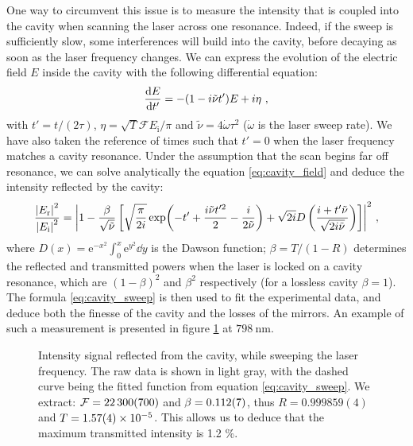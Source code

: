 \documentclass[11pt]{article}
\newcommand{\e}[1]{\text{e}^{#1}}
\numberwithin{equation}{section}
\numberwithin{figure}{section}
\begin{document}
One way to circumvent this issue is to measure the intensity that is coupled into the cavity when scanning the laser across one resonance. Indeed, if the sweep is sufficiently slow, some interferences will build into the cavity, before decaying as soon as the laser frequency changes. We can express the evolution of the electric field $E$ inside the cavity with the following differential equation:
%
\begin{equation}
	\label{eq:cavity_field}
	\dv{E}{t'} = - (1 - i \tilde{\nu} t') E + i \eta~,
\end{equation}
%
with $t' = t / (2 \tau)$, $\eta = \sqrt{T} \mathcal{F} E_\mathrm{i} / \pi$ and $\tilde{\nu} = 4 \dot{\omega} \tau^2$ ($ \dot{\omega}$ is the laser sweep rate). We have also taken the reference of times such that $t'=0$ when the laser frequency matches a cavity resonance. Under the assumption that the scan begins far off resonance, we can solve analytically the equation \eqref{eq:cavity_field} and deduce the intensity reflected by the cavity:
%
\begin{equation}
	\label{eq:cavity_sweep}
	\frac{\abs{E_\text{r}}^2 }{\abs{E_\text{i}}^2 }= \abs{1-\frac{\beta}{\sqrt{\tilde{\nu}}} \left[ \sqrt{\frac{\pi}{2i}} \exp(-t' +\frac{i \tilde{\nu} t'^2}{2} - \frac{i}{2 \tilde{\nu}}) + \sqrt{2i} D\left( \frac{i+t' \tilde{\nu}}{\sqrt{2i \tilde{\nu}}} \right) \right] }^2~,
\end{equation}
%
where $D(x) = \e{-x^2} \int_0^x \e{y^2} \dd{y}$ is the Dawson function; $\beta = T / (1 - R)$ determines the reflected and transmitted powers when the laser is locked on a cavity resonance, which are $(1 - \beta)^2$ and $\beta^2$ respectively (for a lossless cavity $\beta = 1$). The formula \eqref{eq:cavity_sweep} is then used to fit the experimental data, and deduce both the finesse of the cavity and the losses of the mirrors. An example of such a measurement is presented in figure \ref{fig:cavity_finesse} at $\SI{798}{\nano\metre}$.

%
\begin{figure}[htbp]
	\centering
    
	\caption{\small Intensity signal reflected from the cavity, while sweeping the laser frequency. The raw data is shown in light gray, with the dashed curve being the fitted function from equation \eqref{eq:cavity_sweep}. We extract: $ \mathcal{F} = \num{22300\pm700}$ and $\beta = \num{0.112\pm0.007}$, thus 
 $R = 0.999859(4)$ and $T= \num{1.57\pm0.04}\times\num{e-5}$. This allows us to deduce that the maximum transmitted intensity is 1.2 \%.}
    \label{fig:cavity_finesse}
\end{figure}
%
\end{document}
